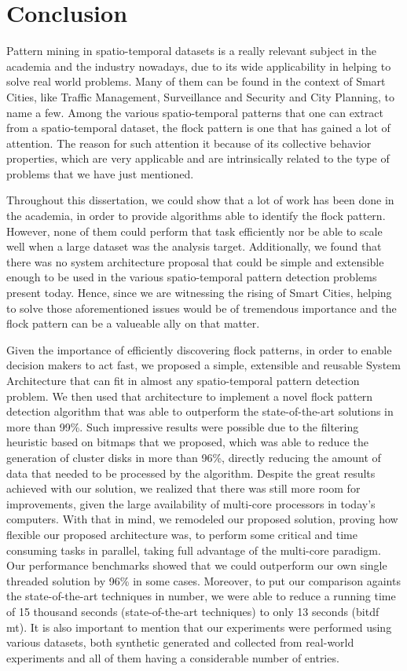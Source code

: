\chapter{Conclusion}
\label{chp:conclusion}
Pattern mining in spatio-temporal datasets is a really relevant subject in the academia and the industry nowadays, due
to its wide applicability in helping to solve real world problems. Many of them can be found in the context of Smart
Cities, like Traffic Management, Surveillance and Security and City Planning, to name a few. Among the various
spatio-temporal patterns that one can extract from a spatio-temporal dataset, the flock pattern is one that has gained a
lot of attention. The reason for such attention it because of its collective behavior properties, which are very
applicable and are intrinsically related to the type of problems that we have just mentioned.

Throughout this dissertation, we could show that a lot of work has been done in the academia, in order to provide
algorithms able to identify the flock pattern. However, none of them could perform that task efficiently nor be able to
scale well when a large dataset was the analysis target. Additionally, we found that there was no system architecture
proposal that could be simple and extensible enough to be used in the various spatio-temporal pattern detection problems
present today. Hence, since we are witnessing the rising of Smart Cities, helping to solve those aforementioned issues
would be of tremendous importance and the flock pattern can be a valueable ally on that matter.

Given the importance of efficiently discovering flock patterns, in order to enable decision makers to act fast, we
proposed a simple, extensible and reusable System Architecture that can fit in almost any spatio-temporal pattern
detection problem. We then used that architecture to implement a novel flock pattern detection algorithm that was able
to outperform the state-of-the-art solutions in more than 99\%. Such impressive results were possible due to the
filtering heuristic based on bitmaps that we proposed, which was able to reduce the generation of cluster disks in more
than 96\%, directly reducing the amount of data that needed to be processed by the algorithm. Despite the great results
achieved with our solution, we realized that there was still more room for improvements, given the large availability of
multi-core processors in today's computers. With that in mind, we remodeled our proposed solution, proving how flexible
our proposed architecture was, to perform some critical and time consuming tasks in parallel, taking full advantage of
the multi-core paradigm. Our performance benchmarks showed that we could outperform our own single threaded solution by
96\% in some cases. Moreover, to put our comparison againts the state-of-the-art techniques in number, we were able to
reduce a running time of 15 thousand seconds (state-of-the-art techniques) to only 13 seconds (\ac{bitdf} \ac{mt}). It
is also important to mention that our experiments were performed using various datasets, both synthetic generated and
collected from real-world experiments and all of them having a considerable number of entries.

